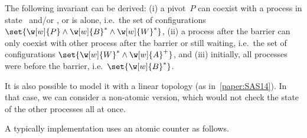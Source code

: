%
The following invariant can be derived: %
(i) a pivot~$P$ can coexist with a process in state~
and/or , or is alone, i.e.\ the set of configurations
$\set{\w[w]{P}\wedge\w[w]{B}^*\wedge\w[w]{W}^*}$, %
(ii) a process after the barrier can only coexist with other process
after the barrier or still waiting, i.e.\ the set of configurations
$\set{\w[w]{W}^*\wedge\w[w]{A}^+}$, %
and (iii) initially, all processes were before the barrier, i.e.\
$\set{\w[w]{B}^*}$.

It is also possible to model it with a linear topology (as
in~\ref{paper:SAS14}).
In that case, we can consider a non-atomic version, which would not
check the state of the other processes all at once.

A typically implementation uses an atomic counter as follows.

